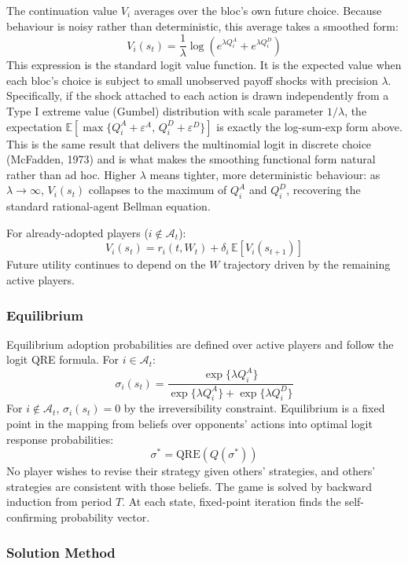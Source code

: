 \documentclass[10pt,a4paper]{article}
\begin{document}
The continuation value $V_i$ averages over the bloc's own future choice. Because behaviour is
noisy rather than deterministic, this average takes a smoothed form:
\[
V_i(s_t) = \frac{1}{\lambda} \log\!\left(e^{\lambda Q_i^A} + e^{\lambda Q_i^D}\right)
\]
This expression is the standard logit value function. It is the expected value when each bloc's
choice is subject to small unobserved payoff shocks with precision $\lambda$. Specifically, if the
shock attached to each action is drawn independently from a Type I extreme value (Gumbel)
distribution with scale parameter $1/\lambda$, the expectation $\mathbb{E}[\max\{Q_i^A + \varepsilon^A,\,
Q_i^D + \varepsilon^D\}]$ is exactly the log-sum-exp form above. This is the same result that
delivers the multinomial logit in discrete choice (McFadden, 1973) and is what makes the
smoothing functional form natural rather than ad hoc. Higher $\lambda$ means tighter, more
deterministic behaviour: as $\lambda \to \infty$, $V_i(s_t)$ collapses to the maximum of $Q_i^A$
and $Q_i^D$, recovering the standard rational-agent Bellman equation.

For already-adopted players ($i \notin \mathcal{A}_t$):
\[
V_i(s_t) = r_i(t, W_t) + \delta_i\, \mathbb{E}[V_i(s_{t+1})]
\]
Future utility continues to depend on the $W$ trajectory driven by the remaining active players.

\needspace{12em}
\subsubsection*{Equilibrium}

Equilibrium adoption probabilities are defined over active players and follow the logit QRE
formula. For $i \in \mathcal{A}_t$:
\[
\sigma_i(s_t) = \frac{\exp\{\lambda Q_i^A\}}{\exp\{\lambda Q_i^A\} + \exp\{\lambda Q_i^D\}}
\]
For $i \notin \mathcal{A}_t$, $\sigma_i(s_t) = 0$ by the irreversibility constraint.
Equilibrium is a fixed point in the mapping from beliefs over opponents' actions into optimal
logit response probabilities:
\[
\sigma^* = \mathrm{QRE}(Q(\sigma^*))
\]
No player wishes to revise their strategy given others' strategies, and others' strategies are
consistent with those beliefs. The game is solved by backward induction from period $T$. At
each state, fixed-point iteration finds the self-confirming probability vector.

\subsubsection*{Solution Method}
\end{document}
